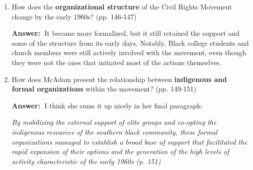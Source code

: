\documentclass{article}
\newcommand{\answer}{\textbf{Answer:}$\;$}
\begin{document}
\begin{enumerate}[label=\arabic*)]
    \answer
    \begin{enumerate}
        \item Oligarchization.
        \item Co-optation.
        \item Dissolution of indigenous support.
    \end{enumerate}
    

    \item How does the \textbf{organizational structure} of the Civil Rights Movement change by the early 1960s? (pp. 146-147)
    
    \answer
    It became more formalized, but it still retained the support and some of the structure from its early days.
    Notably, Black college students and church members were still actively involved with the movement, even though they were not the ones that initiated most of the actions themselves.
    
    \item How does McAdam present the relationship between \textbf{indigenous and formal organizations} within the movement? (pp. 149-151)
    
    \answer
    I think she sums it up nicely in her final paragraph:
    \begin{center}
    \textit{By mobilizing the external support of elite groups and co-opting the indigenous resources of the southern black community, these formal organizations managed to establish a broad base of support that facilitated the rapid expansion of their options and the generation of the high levels of activity characteristic of the early 1960s (p. 151)}        
    \end{center}
    
\end{enumerate}
 
\end{document}
